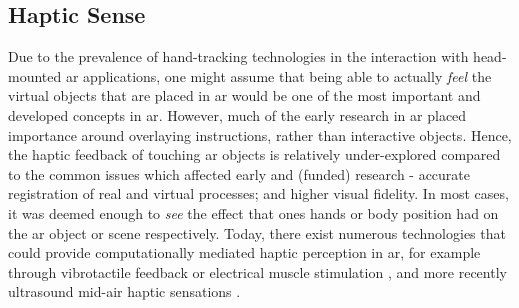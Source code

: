 \subsection{Haptic Sense}\label{sec: ar-sensory-haptic}
Due to the prevalence of hand-tracking technologies in the interaction with head-mounted \gls{ar} applications, one might assume that being able to actually \textit{feel} the virtual objects that are placed in \gls{ar} would be one of the most important and developed concepts in \gls{ar}. However, much of the early research in \gls{ar} placed importance around overlaying instructions, rather than interactive objects. Hence, the haptic feedback of touching \gls{ar} objects is relatively under-explored compared to the common issues which affected early and (funded) research - accurate registration of real and virtual processes; and higher visual fidelity. In most cases, it was deemed enough to \textit{see} the effect that ones hands or body position had on the \gls{ar} object or scene respectively. Today, there exist numerous technologies that could provide computationally mediated haptic perception in \gls{ar}, for example through vibrotactile feedback or electrical muscle stimulation \citep{lopes2018}, and more recently ultrasound mid-air haptic sensations \cite{ablart2019}.

